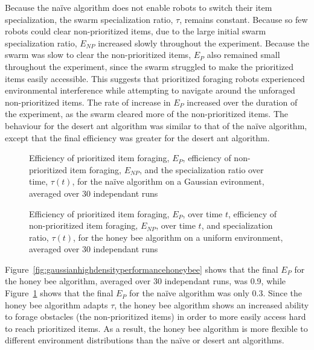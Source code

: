 \documentclass[preprint,12pt]{elsarticle}
\begin{document}
Because the na\"ive algorithm does not enable robots to switch their item specialization, the swarm specialization ratio, $\tau$, remains constant. Because so few robots could clear non-prioritized items, due to the large initial swarm specialization ratio, $E_{NP}$ increased slowly throughout the experiment. Because the swarm was slow to clear the non-prioritized items, $E_P$ also remained small throughout the experiment, since the swarm struggled to make the prioritized items easily accessible. This suggests that prioritized foraging robots experienced environmental interference while attempting to navigate around the unforaged non-prioritized items. The rate of increase in $E_P$ increased over the duration of the experiment, as the swarm cleared more of the non-prioritized items. The behaviour for the desert ant algorithm was similar to that of the na\"ive algorithm, except that the final efficiency was greater for the desert ant algorithm.


\begin{figure}[htb]
\centering
\small
\resizebox{\textwidth}{!}{}
\caption{Efficiency of prioritized item foraging, $E_P$, efficiency of non-prioritized item foraging, $E_{NP}$, and the specialization ratio over time, $\tau(t)$, for the na\"ive algorithm on a Gaussian evironment, averaged over 30 independant runs}
\label{fig:gaussianhighdensityperformancenaive}
\end{figure}

\begin{figure}[htb]
\centering
\small
\resizebox{\textwidth}{!}{}
\caption{Efficiency of prioritized item foraging, $E_P$, over time $t$, efficiency of non-prioritized item foraging, $E_{NP}$, over time $t$, and specialization ratio, $\tau(t)$, for the honey bee algorithm on a uniform environment, averaged over 30 independant runs}
\label{fig:uniformhighdensityperformancehoneybee}
\end{figure}


Figure~\ref{fig:gaussianhighdensityperformancehoneybee} shows that the final $E_P$ for the honey bee algorithm, averaged over 30 independant runs, was 0.9, while Figure~\ref{fig:gaussianhighdensityperformancenaive} shows that the final $E_P$ for the na\"ive algorithm was only 0.3. Since the honey bee algorithm adapts $\tau$, the honey bee algorithm shows an increased ability to forage obstacles (the non-prioritized items) in order to more easily access hard to reach prioritized items. As a result, the honey bee algorithm is more flexible to different environment distributions than the na\"ive or desert ant algorithms.
\end{document}
